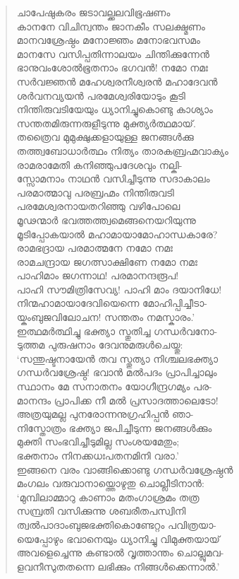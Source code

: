 \begin{verse}
ചാപേഷുകരം ജടാവല്ക്കലവിഭൂഷണം\\
കാനനേ വിചിന്വന്തം ജാനകീം സലക്ഷ്മണം\\
മാനവശ്രേഷ്ഠം മനോജ്ഞം മനോഭവസമം\\
മാനസേ വസിപ്പതിന്നാലയം ചിന്തിക്കുന്നേന്‍\\
ഭാനുവംശോല്‍ഭൂതനാം ഭഗവന്‍! നമോ നമഃ\\
സര്‍വജ്ഞന്‍ മഹേശ്വരനീശ്വരന്‍ മഹാദേവന്‍\\
ശര്‍വനവ്യയന്‍ പരമേശ്വരിയോടും കൂടി\\
നിന്തിരുവടിയേയും ധ്യാനിച്ചുകൊണ്ടു കാശ്യാം\\
സന്തതമിരുന്നരുളീടുന്നു മുക്ത്യര്‍ത്ഥമായ്.\\
തത്രൈവ മുമുക്ഷുക്കളായുള്ള ജനങ്ങള്‍ക്കു\\
തത്ത്വബോധാര്‍ത്ഥം നിത്യം താരകബ്രഹ്മവാക്യം\\
രാമരാമേതി കനിഞ്ഞുപദേശവും നല്കി-\\
സ്സോമനാം നാഥന്‍ വസിച്ചീടുന്നു സദാകാലം\\
പരമാത്മാവു പരബ്രഹ്മം നിന്തിരുവടി\\
പരമേശ്വരനായതറിഞ്ഞു വഴിപോലെ\\
മൂഢന്മാര്‍ ഭവത്തത്ത്വമെങ്ങനെയറിയുന്നു\\
മൂടിപ്പോകയാല്‍ മഹാമായാമോഹാന്ധകാരേ?\\
രാമഭദ്രായ പരമാത്മനേ നമോ നമഃ\\
രാമചന്ദ്രായ ജഗത്സാക്ഷിണേ നമോ നമഃ\\
പാഹിമാം ജഗന്നാഥ! പരമാനന്ദരൂപ!\\
പാഹി സൗമിത്രിസേവ്യ! പാഹി മാം ദയാനിധേ!\\
നിന്മഹാമായാദേവിയെന്നെ മോഹിപ്പിച്ചീടാ-\\
യ്കംബുജവിലോചന! സന്തതം നമസ്കാരം.’\\
ഇത്ഥമര്‍ത്ഥിച്ചു ഭക്ത്യാ സ്തുതിച്ച ഗന്ധര്‍വനോ-\\
ടുത്തമ പുരുഷനാം ദേവനുമരുള്‍ചെയ്തു:\\
‘സന്തുഷ്ടനായേന്‍ തവ സ്തുത്യാ നിശ്ചലഭക്ത്യാ\\
ഗന്ധര്‍വശ്രേഷ്ഠ! ഭവാന്‍ മല്‍പദം പ്രാപിച്ചാലും\\
സ്ഥാനം മേ സനാതനം യോഗീന്ദ്രഗമ്യം പര-\\
മാനന്ദം പ്രാപിക്ക നീ മല്‍ പ്രസാദത്താലെടോ!\\
അത്രയുമല്ല പുനരോന്നനുഗ്രഹിപ്പന്‍ ഞാ-\\
നിസ്തോത്രം ഭക്ത്യാ ജപിച്ചീടുന്ന ജനങ്ങള്‍ക്കും\\
മുക്തി സംഭവിച്ചീടുമില്ല സംശയമേതും;\\
ഭക്തനാം നിനക്കധഃപതനമിനി വരാ.’\\
ഇങ്ങനെ വരം വാങ്ങിക്കൊണ്ടു ഗന്ധര്‍വശ്രേഷ്ഠന്‍\\
മംഗലം വരുവാനായ്ത്തൊഴുതു ചൊല്ലീടിനാന്‍:\\
‘മുമ്പിലാമ്മാറു കാണാം മതംഗാശ്രമം തത്ര\\
സമ്പ്രതി വസിക്കുന്നു ശബരീതപസ്വിനി\\
ത്വല്‍പാദാംബുജഭക്തികൊണ്ടേറ്റം പവിത്രയാ-\\
യെപ്പോഴും ഭവാനെയും ധ്യാനിച്ചു വിമുക്തയായ്\\
അവളെച്ചെന്നു കണ്ടാല്‍ വൃത്താന്തം ചൊല്ലുമവ-\\
ളവനീസുതതന്നെ ലഭിക്കും നിങ്ങള്‍ക്കെന്നാല്‍.’
\end{verse}


